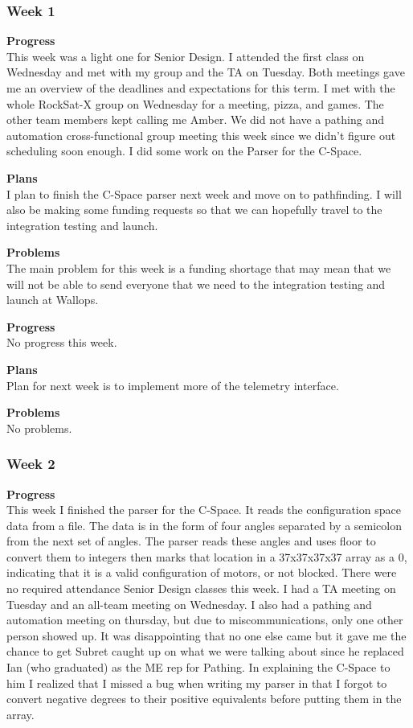 \subsubsection{Week 1}
\textbf{Progress} \\
This week was a light one for Senior Design. I attended the first class on Wednesday and met with my group and the TA on Tuesday. Both meetings gave me an overview of the deadlines and expectations for this term. I met with the whole RockSat-X group on Wednesday for a meeting, pizza, and games. The other team members kept calling me Amber. We did not have a pathing and automation cross-functional group meeting this week since we didn't figure out scheduling soon enough. I did some work on the Parser for the C-Space.

\textbf{Plans} \\ 
I plan to finish the C-Space parser next week and move on to pathfinding. I will also be making some funding requests so that we can hopefully travel to the integration testing and launch.

\textbf{Problems} \\ 
The main problem for this week is a funding shortage that may mean that we will not be able to send everyone that we need to the integration testing and launch at Wallops.

\textbf{Progress} \\
No progress this week.

\textbf{Plans} \\
Plan for next week is to implement more of the telemetry interface.

\textbf{Problems} \\
No problems.

\subsubsection{Week 2}
\textbf{Progress} \\
This week I finished the parser for the C-Space. It reads the configuration space data from a file. The data is in the form of four angles separated by a semicolon from the next set of angles. The parser reads these angles and uses floor to convert them to integers then marks that location in a 37x37x37x37 array as a 0, indicating that it is a valid configuration of motors, or not blocked. There were no required attendance Senior Design classes this week. I had a TA meeting on Tuesday and an all-team meeting on Wednesday. I also had a pathing and automation meeting on thursday, but due to miscommunications, only one other person showed up. It was disappointing that no one else came but it gave me the chance to get Subret caught up on what we were talking about since he replaced Ian (who graduated) as the ME rep for Pathing. In explaining the C-Space to him I realized that I missed a bug when writing my parser in that I forgot to convert negative degrees to their positive equivalents before putting them in the array.

